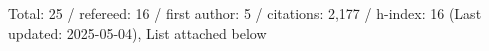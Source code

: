 Total: 25 / refereed: 16 / first author: 5 / citations: 2,177 / h-index: 16 (Last updated: 2025-05-04), List attached below